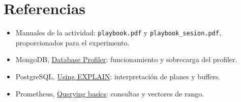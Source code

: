 \documentclass[12pt,letterpaper]{article}
\begin{document}
\section*{Referencias}
\begin{itemize}
\item Manuales de la actividad: \texttt{playbook.pdf} y \texttt{playbook\_\allowbreak{}sesion.pdf}, proporcionados para el experimento.
\item MongoDB, \href{https://www.mongodb.com/docs/manual/tutorial/manage-the-database-profiler/}{Database Profiler}: funcionamiento y sobrecarga del profiler.
\item PostgreSQL, \href{https://www.postgresql.org/docs/current/using-explain.html}{Using EXPLAIN}: interpretación de planes y buffers.
\item Prometheus, \href{https://prometheus.io/docs/prometheus/latest/querying/basics/}{Querying basics}: consultas y vectores de rango.
\end{itemize}
\end{document}
